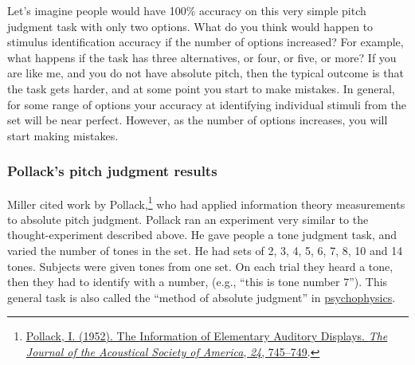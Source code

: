 \documentclass[
  oneside,
  12pt]{crumpbook}
\begin{document}
Let's imagine people would have 100\% accuracy on this very simple pitch judgment task with only two options. What do you think would happen to stimulus identification accuracy if the number of options increased? For example, what happens if the task has three alternatives, or four, or five, or more? If you are like me, and you do not have absolute pitch, then the typical outcome is that the task gets harder, and at some point you start to make mistakes. In general, for some range of options your accuracy at identifying individual stimuli from the set will be near perfect. However, as the number of options increases, you will start making mistakes.

\hypertarget{pollacks-pitch-judgment-results}{%
\subsubsection{Pollack's pitch judgment results}\label{pollacks-pitch-judgment-results}}

Miller cited work by Pollack,\footnote{\protect\hyperlink{ref-pollackInformationElementaryAuditory1952a}{Pollack, I. (1952). The {Information} of {Elementary Auditory Displays}. \emph{The Journal of the Acoustical Society of America}, \emph{24}, 745--749}.} who had applied information theory measurements to absolute pitch judgment. Pollack ran an experiment very similar to the thought-experiment described above. He gave people a tone judgment task, and varied the number of tones in the set. He had sets of 2, 3, 4, 5, 6, 7, 8, 10 and 14 tones. Subjects were given tones from one set. On each trial they heard a tone, then they had to identify with a number, (e.g., ``this is tone number 7''). This general task is also called the ``method of absolute judgment'' in \href{https://en.wikipedia.org/wiki/Psychophysics}{psychophysics}.
\end{document}
